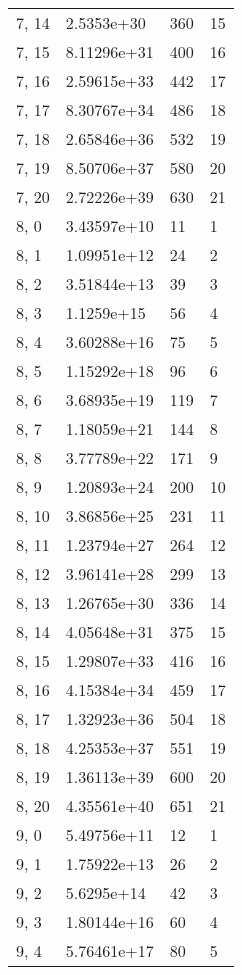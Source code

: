 \begin{table}
\begin{tabular}{llll}
7, 14  &   2.5353e+30 &  360 &    15 \\
7, 15  &  8.11296e+31 &  400 &    16 \\
7, 16  &  2.59615e+33 &  442 &    17 \\
7, 17  &  8.30767e+34 &  486 &    18 \\
7, 18  &  2.65846e+36 &  532 &    19 \\
7, 19  &  8.50706e+37 &  580 &    20 \\
7, 20  &  2.72226e+39 &  630 &    21 \\
8, 0   &  3.43597e+10 &   11 &     1 \\
8, 1   &  1.09951e+12 &   24 &     2 \\
8, 2   &  3.51844e+13 &   39 &     3 \\
8, 3   &   1.1259e+15 &   56 &     4 \\
8, 4   &  3.60288e+16 &   75 &     5 \\
8, 5   &  1.15292e+18 &   96 &     6 \\
8, 6   &  3.68935e+19 &  119 &     7 \\
8, 7   &  1.18059e+21 &  144 &     8 \\
8, 8   &  3.77789e+22 &  171 &     9 \\
8, 9   &  1.20893e+24 &  200 &    10 \\
8, 10  &  3.86856e+25 &  231 &    11 \\
8, 11  &  1.23794e+27 &  264 &    12 \\
8, 12  &  3.96141e+28 &  299 &    13 \\
8, 13  &  1.26765e+30 &  336 &    14 \\
8, 14  &  4.05648e+31 &  375 &    15 \\
8, 15  &  1.29807e+33 &  416 &    16 \\
8, 16  &  4.15384e+34 &  459 &    17 \\
8, 17  &  1.32923e+36 &  504 &    18 \\
8, 18  &  4.25353e+37 &  551 &    19 \\
8, 19  &  1.36113e+39 &  600 &    20 \\
8, 20  &  4.35561e+40 &  651 &    21 \\
9, 0   &  5.49756e+11 &   12 &     1 \\
9, 1   &  1.75922e+13 &   26 &     2 \\
9, 2   &   5.6295e+14 &   42 &     3 \\
9, 3   &  1.80144e+16 &   60 &     4 \\
9, 4   &  5.76461e+17 &   80 &     5 \\

\end{tabular}
\end{table}
